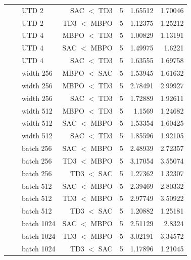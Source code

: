 {\begin{longtable}{@{}lllrrrr@{}}
     &  & UTD 2 & SAC $<$ TD3 & \num{5} & \num{1.65512} & \num{1.70046} \\
     &  & UTD 2 & TD3 $<$ MBPO & \num{5} & \num{1.12375} & \num{1.25212} \\
     &  & UTD 4 & MBPO $<$ TD3 & \num{5} & \num{1.00829} & \num{1.13191} \\
     &  & UTD 4 & SAC $<$ MBPO & \num{5} & \num{1.49975} & \num{1.6221} \\
     &  & UTD 4 & SAC $<$ TD3 & \num{5} & \num{1.63555} & \num{1.69758} \\
     &  & width 256 & MBPO $<$ SAC & \num{5} & \num{1.53945} & \num{1.61632} \\
     &  & width 256 & MBPO $<$ TD3 & \num{5} & \num{2.78491} & \num{2.99927} \\
     &  & width 256 & SAC $<$ TD3 & \num{5} & \num{1.72889} & \num{1.92611} \\
     &  & width 512 & MBPO $<$ TD3 & \num{5} & \num{1.1569} & \num{1.24682} \\
     &  & width 512 & SAC $<$ MBPO & \num{5} & \num{1.53354} & \num{1.60425} \\
     &  & width 512 & SAC $<$ TD3 & \num{5} & \num{1.85596} & \num{1.92105} \\
     &  & batch 256 & SAC $<$ MBPO & \num{5} & \num{2.48939} & \num{2.72357} \\
     &  & batch 256 & TD3 $<$ MBPO & \num{5} & \num{3.17054} & \num{3.55074} \\
     &  & batch 256 & TD3 $<$ SAC & \num{5} & \num{1.27362} & \num{1.32307} \\
     &  & batch 512 & SAC $<$ MBPO & \num{5} & \num{2.39469} & \num{2.80332} \\
     &  & batch 512 & TD3 $<$ MBPO & \num{5} & \num{2.97749} & \num{3.50922} \\
     &  & batch 512 & TD3 $<$ SAC & \num{5} & \num{1.20882} & \num{1.25181} \\
     &  & batch 1024 & SAC $<$ MBPO & \num{5} & \num{2.51129} & \num{2.8324} \\
     &  & batch 1024 & TD3 $<$ MBPO & \num{5} & \num{3.02191} & \num{3.34572} \\
     &  & batch 1024 & TD3 $<$ SAC & \num{5} & \num{1.17896} & \num{1.21045} \\
  \end{longtable}
}
